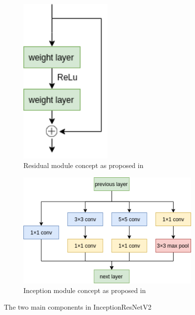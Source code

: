 \begin{figure}
     \centering
     \begin{subfigure}[t]{0.4\textwidth}
         \centering
         \includegraphics[width=0.5\textwidth]{methodology/figures/residual.png}
         \caption{Residual module concept as proposed in~\cite{DBLP:journals/corr/HeZRS15}}
         \label{fig:Residual}
     \end{subfigure}
     \hfill
     \begin{subfigure}[t]{0.55\textwidth}
         \centering
         \includegraphics[width=\textwidth]{methodology/figures/inception.png}
         \caption{Inception module concept as proposed in~\cite{DBLP:journals/corr/SzegedyLJSRAEVR14}}
         \label{fig:Inception}
     \end{subfigure}
     \caption{The two main components in InceptionResNetV2}
     \label{fig:IRV2modules}
\end{figure}
